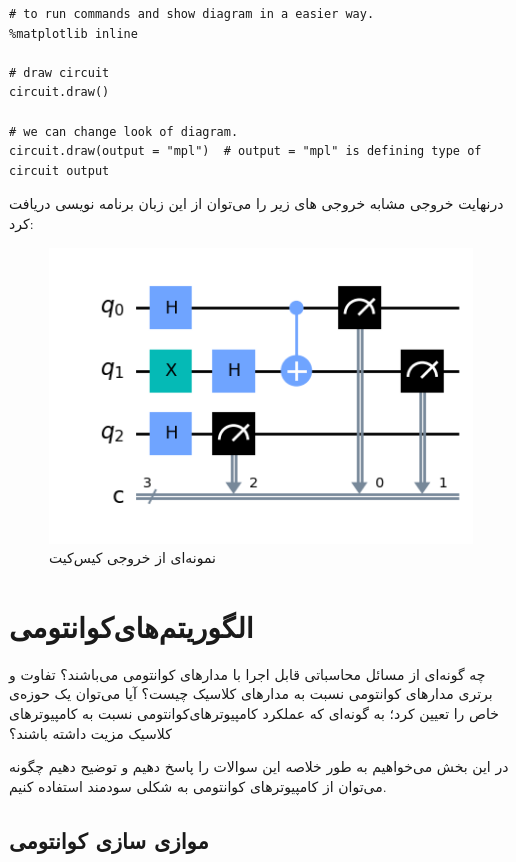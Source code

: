 \documentclass{book}
\begin{document}
\begin{latin}
\begin{verbatim}
# to run commands and show diagram in a easier way.
%matplotlib inline 

# draw circuit
circuit.draw()

# we can change look of diagram.
circuit.draw(output = "mpl")  # output = "mpl" is defining type of circuit output

\end{verbatim}
\end{latin}

درنهایت خروجی مشابه خروجی های زیر را می‌توان از این زبان برنامه نویسی دریافت کرد:

\begin{center}
\begin{figure}[h]
\centering
\includegraphics[]{tutorials_circuits_advanced_03_advanced_circuit_visualization_7_0.png}
\caption{نمونه‌ای از خروجی کیس‌کیت}
\end{figure}
\end{center}
\let\cleardoublepage\clearpage
\chapter{الگوریتم‌های‌کوانتومی‌}


چه گونه‌ای از مسائل محاسباتی قابل اجرا با مدارهای کوانتومی می‌باشند؟ 
تفاوت و برتری مدار‌های کوانتومی نسبت به مدار‌های کلاسیک چیست؟
آیا می‌توان یک حوزه‌ی خاص را تعیین کرد؛ به گونه‌ای که عملکرد کامپیوترهای‌‌کوانتومی نسبت به کامپیوتر‌های کلاسیک مزیت داشته باشند؟

در این بخش می‌خواهیم به طور خلاصه این سوالات را پاسخ دهیم و توضیح دهیم چگونه می‌توان از کامپیوتر‌های کوانتومی به شکلی سودمند استفاده کنیم.

\section{موازی سازی کوانتومی}
\end{document}
